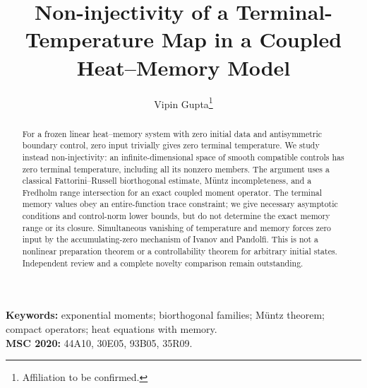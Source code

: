 \documentclass[11pt,a4paper]{article}
\title{Non-injectivity of a Terminal-Temperature Map in a Coupled Heat--Memory Model}
\author{Vipin Gupta\thanks{Affiliation to be confirmed.}}
\date{}
\numberwithin{equation}{section}
\theoremstyle{definition}
\begin{document}
\maketitle
\begin{abstract}
For a frozen linear heat--memory system with zero initial data and antisymmetric boundary control, zero input trivially gives zero terminal temperature. We study instead non-injectivity: an infinite-dimensional space of smooth compatible controls has zero terminal temperature, including all its nonzero members. The argument uses a classical Fattorini--Russell biorthogonal estimate, M\"untz incompleteness, and a Fredholm range intersection for an exact coupled moment operator. The terminal memory values obey an entire-function trace constraint; we give necessary asymptotic conditions and control-norm lower bounds, but do not determine the exact memory range or its closure. Simultaneous vanishing of temperature and memory forces zero input by the accumulating-zero mechanism of Ivanov and Pandolfi. This is not a nonlinear preparation theorem or a controllability theorem for arbitrary initial states. Independent review and a complete novelty comparison remain outstanding.
\end{abstract}
\noindent\textbf{Keywords:} exponential moments; biorthogonal families; M\"untz theorem; compact operators; heat equations with memory.\\
\textbf{MSC 2020:} 44A10, 30E05, 93B05, 35R09.














\end{document}
